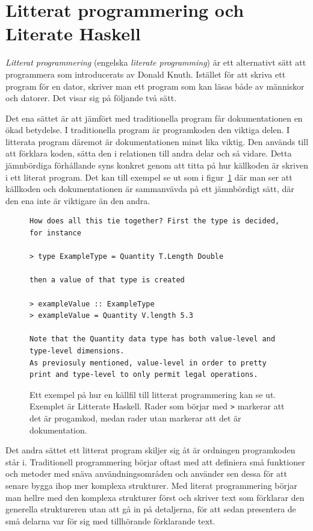 \section{Litterat programmering och Literate Haskell}\label{sec:lhs}
\begin{draft}
\textit{Litterat programmering} (engelska \textit{literate programming}) är ett
alternativt sätt att programmera som introducerats av Donald Knuth\cite{knuth}.
Istället för att skriva ett program för en dator, skriver man ett program som
kan läsas både av människor och datorer. Det visar sig på följande två sätt.

Det ena sättet är att jämfört med traditionella program får dokumentationen en
ökad betydelse. I traditionella program är programkoden den viktiga delen. I
litterata program däremot är dokumentationen minst lika viktig. Den används till
att förklara koden, sätta den i relationen till andra delar och så vidare.
Detta jämnbördiga förhållande syns konkret genom att titta på hur källkoden är
skriven i ett literat program. Det kan till exempel se ut som i
figur~\ref{fig:litterate_haskell_exempel} där man ser att källkoden och
dokumentationen är sammanvävda på ett jämnbördigt sätt, där den ena inte är
viktigare än den andra.

\begin{figure}[tph]
  \begin{lstlisting}[language={}]
How does all this tie together? First the type is decided, for instance

> type ExampleType = Quantity T.Length Double

then a value of that type is created

> exampleValue :: ExampleType
> exampleValue = Quantity V.length 5.3

Note that the Quantity data type has both value-level and type-level dimensions.
As previosuly mentioned, value-level in order to pretty print and type-level to only permit legal operations.
\end{lstlisting}
  \caption{Ett exempel på hur en källfil till litterat programmering kan se ut.
           Exemplet är Litterate Haskell. Rader som börjar med \texttt{>}
           markerar att det är progamkod, medan rader utan markerar att det är
           dokumentation.}\label{fig:litterate_haskell_exempel} 
\end{figure}

Det andra sättet ett litterat program skiljer sig åt är ordningen programkoden
står i. Traditionell programmering börjar oftast med att definiera små funktioner
och metoder med snäva användningsområden och använder sen dessa för att senare
bygga ihop mer komplexa strukturer. Med literat programmering börjar man hellre
med den komplexa strukturer först och skriver text som förklarar den generella
struktureren utan att gå in på detaljerna, för att sedan presentera de små
delarna var för sig med tillhörande förklarande text.


\end{draft}

